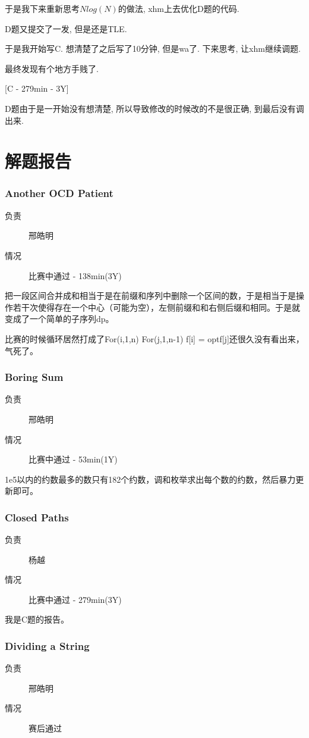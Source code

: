 \documentclass[a4paper, 11pt, nofonts, nocap, fancyhdr]{ctexart}
\newcommand{\problem}[1]{\subsubsection{#1}}
\begin{document}
于是我下来重新思考$Nlog(N)$的做法, xhm上去优化D题的代码.

D题又提交了一发, 但是还是TLE.

于是我开始写C. 想清楚了之后写了10分钟, 但是wa了. 下来思考, 让xhm继续调题.

最终发现有个地方手贱了.

[C - 279min - 3Y]

D题由于是一开始没有想清楚, 所以导致修改的时候改的不是很正确, 到最后没有调出来.

\section{解题报告}

\problem{Another OCD Patient}

\begin{description}
\item[负责] 邢皓明
\item[情况] 比赛中通过 - 138min(3Y)
\end{description}

把一段区间合并成和相当于是在前缀和序列中删除一个区间的数，于是相当于是操作若干次使得存在一个中心（可能为空），左侧前缀和和右侧后缀和相同。于是就变成了一个简单的子序列dp。

比赛的时候循环居然打成了For(i,1,n) For(j,1,n-1) f[i] = opt{f[j]}还很久没有看出来，气死了。

\problem{Boring Sum}

\begin{description}
\item[负责] 邢皓明
\item[情况] 比赛中通过 - 53min(1Y)
\end{description}

1e5以内的约数最多的数只有182个约数，调和枚举求出每个数的约数，然后暴力更新即可。

\problem{Closed Paths}

\begin{description}
\item[负责] 杨越
\item[情况] 比赛中通过 - 279min(3Y)
\end{description}

我是C题的报告。

\problem{Dividing a String}

\begin{description}
\item[负责] 邢皓明
\item[情况] 赛后通过
\end{description}
\end{document}
